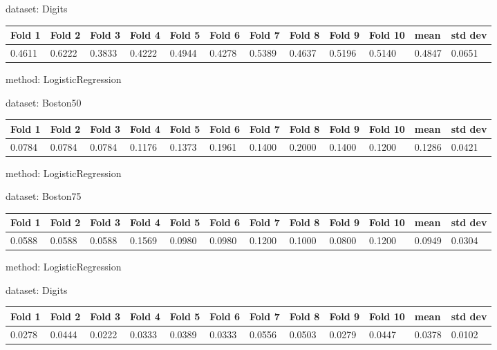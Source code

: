 \documentclass{article}
\begin{document}
\noindent dataset: Digits

\begin{center}
	\begin{tabular}  { | l | l | l | l | l | l | l | l | l | l | l | l | }
	\hline
	Fold 1 & Fold 2 & Fold 3 & Fold 4 & Fold 5 & Fold 6 & Fold 7 & Fold 8 & Fold 9 & Fold 10 & mean & std dev\\ \hline
	0.4611 & 0.6222 & 0.3833 & 0.4222 & 0.4944 & 0.4278 & 0.5389 & 0.4637 & 0.5196 & 0.5140 & 0.4847 & 0.0651\\
	\hline
	\end{tabular}
\end{center}
\noindent method: LogisticRegression

\noindent dataset: Boston50

\begin{center}
	\begin{tabular}  { | l | l | l | l | l | l | l | l | l | l | l | l | }
	\hline
	Fold 1 & Fold 2 & Fold 3 & Fold 4 & Fold 5 & Fold 6 & Fold 7 & Fold 8 & Fold 9 & Fold 10 & mean & std dev\\ \hline
	0.0784 & 0.0784 & 0.0784 & 0.1176 & 0.1373 & 0.1961 & 0.1400 & 0.2000 & 0.1400 & 0.1200 & 0.1286 & 0.0421\\
	\hline
	\end{tabular}
\end{center}
\noindent method: LogisticRegression

\noindent dataset: Boston75

\begin{center}
	\begin{tabular}  { | l | l | l | l | l | l | l | l | l | l | l | l | }
	\hline
	Fold 1 & Fold 2 & Fold 3 & Fold 4 & Fold 5 & Fold 6 & Fold 7 & Fold 8 & Fold 9 & Fold 10 & mean & std dev\\ \hline
	0.0588 & 0.0588 & 0.0588 & 0.1569 & 0.0980 & 0.0980 & 0.1200 & 0.1000 & 0.0800 & 0.1200 & 0.0949 & 0.0304\\
	\hline
	\end{tabular}
\end{center}
\noindent method: LogisticRegression

\noindent dataset: Digits

\begin{center}
	\begin{tabular}  { | l | l | l | l | l | l | l | l | l | l | l | l | }
	\hline
	Fold 1 & Fold 2 & Fold 3 & Fold 4 & Fold 5 & Fold 6 & Fold 7 & Fold 8 & Fold 9 & Fold 10 & mean & std dev\\ \hline
	0.0278 & 0.0444 & 0.0222 & 0.0333 & 0.0389 & 0.0333 & 0.0556 & 0.0503 & 0.0279 & 0.0447 & 0.0378 & 0.0102\\
	\hline
	\end{tabular}
\end{center}
\end{document}

